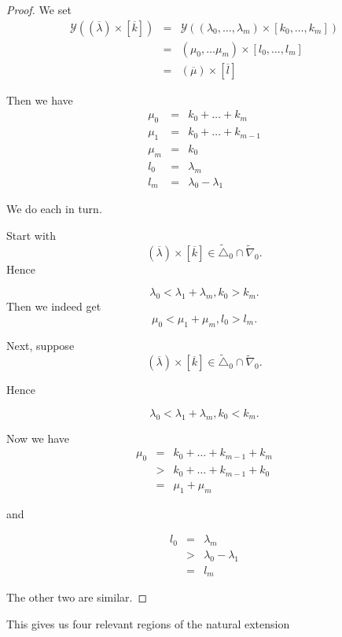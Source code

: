 \documentclass[12pt,oneside,openany]{article}
\begin{document}
\begin{proof}

We set 
\begin{eqnarray*}
\mathcal{Y} \left((\overline{\lambda}) \times [ \overline{k}] \right) &=& \mathcal{Y} \left( (\lambda_0 , \ldots, \lambda_m) \times [ k_0, \ldots, k_m] \right)  \\
&=& (\mu_0, \ldots \mu_m) \times [l_0, \ldots, l_m] \\
&=& (\overline{\mu}) \times [ \overline{l}]
\end{eqnarray*}

Then we have 
\begin{eqnarray*}
\mu_0 &=& k_0 + \ldots + k_m \\
\mu_1 &=& k_0 + \ldots + k_{m-1} \\
\mu_m &=& k_0  \\
l_0 &=&\lambda_m \\
l_m&=& \lambda_0 - \lambda_1
\end{eqnarray*}

We do each in turn.

Start with  $$(\overline{\lambda}) \times [ \overline{k}] \in  \tilde{\triangle}_0 \cap  \tilde{\nabla}_0 .$$
Hence

$$\lambda_0 < \lambda_1 + \lambda_m, k_0>k_m.$$
Then we indeed get 
$$\mu_0 < \mu_1 + \mu_m, l_0>l_m.$$


Next, suppose   $$(\overline{\lambda}) \times [ \overline{k}] \in  \tilde{\triangle}_0 \cap  \tilde{\nabla}_0 .$$

Hence

$$\lambda_0 < \lambda_1 + \lambda_m, k_0<k_m.$$

Now we have 
\begin{eqnarray*}
\mu_0 &=& k_0 + \ldots + k_{m-1} + k_m \\
&>&k_0 + \ldots + k_{m-1} + k_0 \\
&=& \mu_1 + \mu_m
\end{eqnarray*}

and

\begin{eqnarray*}
l_0 &=& \lambda_m \\
&>&\lambda_0 - \lambda_1 \\
&=&l_m
\end{eqnarray*}

The other two are similar.
\end{proof}


This gives us four relevant regions of the natural extension
\end{document}

